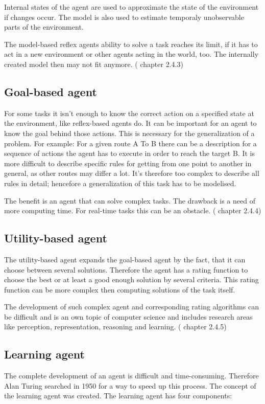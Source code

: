 \documentclass[10pt,a4paper,DIV=11]{scrreprt}
\begin{document}
Internal states of the agent are used to approximate the state of the environment if changes occur. 
The model is also used to estimate temporaly unobservable parts of the environment.

The model-based reflex agents ability to solve a task reaches its limit, if it has to act in a new environment or other agents acting in the world, too. The internally created model then may not fit anymore.
(\cite{ai} chapter 2.4.3)

\subsection{Goal-based agent}
For some tasks it isn't enough to know the correct action on a specified state at the environment, like reflex-based agents do. It can be important for an agent to know the goal behind those actions. This is necessary for the generalization of a problem. For example: For a given route A To B there can be a description for a sequence of actions the agent has to execute in order to reach the target B. It is more difficult to describe specific rules for getting from one point to another in general, as other routes may differ a lot. It's therefore too complex to describe all rules in detail; hencefore a generalization of this task has to be modelised.

The benefit is an agent that can solve complex tasks. The drawback is a need of more computing time. For real-time tasks this can be an obstacle.
(\cite{ai} chapter 2.4.4)

\subsection{Utility-based agent}
The utility-based agent expands the goal-based agent by the fact, that it can choose between several solutions. Therefore the agent has a rating function to choose the best or at least a good enough solution by several criteria. This rating function can be more complex then computing solutions of the task itself.

The development of such complex agent and corresponding rating algorithms can be difficult and is an own topic of computer science and includes research areas like perception, representation, reasoning and learning.
(\cite{ai} chapter 2.4.5)

\subsection{Learning agent}
The complete development of an agent is difficult and time-consuming. Therefore Alan Turing searched in 1950 for a way to speed up this process.\cite{turing} The concept of the learning agent was created. The learning agent has four components: \\
\end{document}
